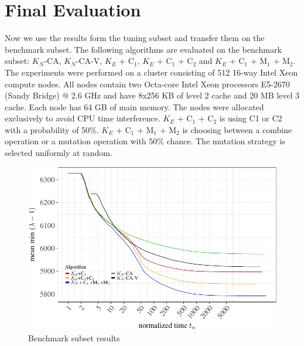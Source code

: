 \documentclass[a4paper,12pt,titlepage, BCOR7mm,headsepline]{scrbook}
\numberwithin{equation}{section}
\begin{document}
\section{Final Evaluation}
Now we use the results form the tuning subset and transfer them on the benchmark subset. The following algorithms are evaluated on the benchmark subset: $K_N$-CA, $K_N$-CA-V, $K_E$ + C$_1$, $K_E$ + C$_1$ + C$_2$ and $K_E$ + C$_1$ + M$_1$ + M$_2$. The experiments were performed on a cluster consisting of 512 16-way Intel Xeon compute nodes. All nodes contain two Octa-core Intel Xeon processors E5-2670 (Sandy Bridge) @ 2.6 GHz and have 8x256 KB of level 2 cache and 20 MB level 3 cache. Each node has 64 GB of main memory. The nodes were allocated exclusively to avoid CPU time interference. $K_E$ + C$_1$ + C$_2$ is using C1 or C2 with a probability of 50\%. $K_E$ + C$_1$ + M$_1$ + M$_2$ is choosing between a combine operation or a mutation operation with 50\% chance. The mutation strategy is selected uniformly at random.
\begin{figure}[H]

\begin{center}
\includegraphics[width=\textwidth]{rnw/tuning_subset_plots/full_plot-1}\caption{Benchmark subset results}

\end{center}

\end{figure}
\end{document}
